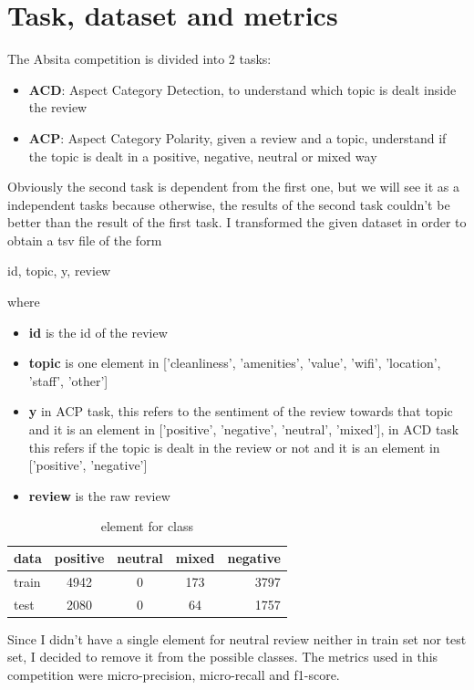 \documentclass{article}
\begin{document}
    \section{Task, dataset and metrics}\label{sec:s1}
        The Absita competition is divided into 2 tasks:
        \begin{itemize}
            \item \textbf{ACD}: Aspect Category Detection, to understand which topic is dealt inside the review
            \item \textbf{ACP}: Aspect Category Polarity, given a review and a topic, understand if the topic is dealt in a positive, negative, neutral or mixed way
        \end{itemize}
        Obviously the second task is dependent from the first one, but we will see it as a independent tasks
        because otherwise, the results of the second task couldn't be better than the result of the first task.
        I transformed the given dataset in order to obtain a tsv file of the form
        \\\centerline{id, topic, y, review}
        where
        \begin{itemize}
            \item \textbf{id} is the id of the review
            \item \textbf{topic} is one element in ['cleanliness', 'amenities', 'value', 'wifi', 'location', 'staff', 'other']
            \item \textbf{y} in ACP task, this refers to the sentiment of the review towards that topic and it is an element in ['positive', 'negative', 'neutral', 'mixed'], in ACD task this refers if the topic is dealt in the review or not and it is an element in ['positive', 'negative']
            \item \textbf{review} is the raw review
        \end{itemize}
        \begin{table}[h!]
            \begin{center}
                \caption{element for class}
                \label{tab:table1}
                \begin{tabular}{l|c|c|c|r}
                    \textbf{data} & \textbf{positive} & \textbf{neutral} & \textbf{mixed} & \textbf{negative}\\
                    \hline
                        train & 4942 & 0 & 173 & 3797\\
                        test & 2080 & 0 & 64 & 1757\\
                \end{tabular}
            \end{center}
        \end{table}
        Since I didn't have a single element for neutral review neither in train set nor test set, I decided to remove it from the possible classes.
        The metrics used in this competition were micro-precision, micro-recall and f1-score.
\end{document}
